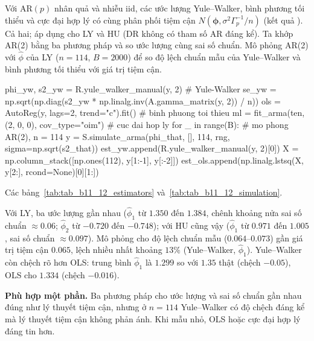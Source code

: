  Với AR$(p)$ nhân quả và nhiễu iid, các ước lượng Yule--Walker, bình phương tối thiểu và cực đại hợp lý có cùng phân phối tiệm cận $N(\boldsymbol\phi,\sigma^2\Gamma_p^{-1}/n)$ (kết quả ).
 Cả hai; áp dụng cho LY và HU (DR không có tham số AR đáng kể). Ta khớp AR(2) bằng ba phương pháp và so ước lượng cùng sai số chuẩn. Mô phỏng AR(2) với $\hat\phi$ của LY ($n=114$, $B=2000$) để so độ lệch chuẩn mẫu của Yule--Walker và bình phương tối thiểu với giá trị tiệm cận.
\begin{codeblock}
phi_yw, s2_yw = R.yule_walker_manual(y, 2)                  # Yule-Walker
se_yw = np.sqrt(np.diag(s2_yw * np.linalg.inv(A.gamma_matrix(y, 2)) / n))
ols = AutoReg(y, lags=2, trend="c").fit()                   # binh phuong toi thieu
ml = fit_arma(ten, (2, 0, 0), cov_type="oim")               # cuc dai hop ly
for _ in range(B):                                          # mo phong AR(2), n = 114
    y = S.simulate_arma(phi_that, [], 114, rng, sigma=np.sqrt(s2_that))
    est_yw.append(R.yule_walker_manual(y, 2)[0])
    X = np.column_stack([np.ones(112), y[1:-1], y[:-2]])
    est_ols.append(np.linalg.lstsq(X, y[2:], rcond=None)[0][1:])
\end{codeblock}
 Các bảng~\ref{tab:tab_b11_12_estimators} và~\ref{tab:tab_b11_12_simulation}.


 Với LY, ba ước lượng gần nhau ($\hat\phi_1$ từ $1.350$ đến $1.384$, chênh khoảng nửa sai số chuẩn $\approx0.06$; $\hat\phi_2$ từ $-0.720$ đến $-0.748$); với HU cũng vậy ($\hat\phi_1$ từ $0.971$ đến $1.005$, sai số chuẩn $\approx0.097$). Mô phỏng cho độ lệch chuẩn mẫu ($0.064$--$0.073$) gần giá trị tiệm cận $0.065$, lệch nhiều nhất khoảng $13\%$ (Yule--Walker, $\hat\phi_1$). Yule--Walker còn chệch rõ hơn OLS: trung bình $\hat\phi_1$ là $1.299$ so với $1.35$ thật (chệch $-0.05$), OLS cho $1.334$ (chệch $-0.016$).

 \textbf{Phù hợp một phần.} Ba phương pháp cho ước lượng và sai số chuẩn gần nhau đúng như lý thuyết tiệm cận, nhưng ở $n=114$ Yule--Walker có độ chệch đáng kể mà lý thuyết tiệm cận không phản ánh. Khi mẫu nhỏ, OLS hoặc cực đại hợp lý đáng tin hơn.

